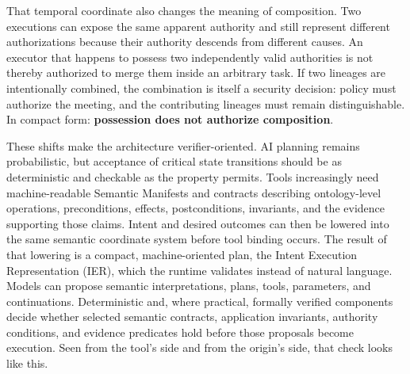 \documentclass[10pt,oneside,openany]{book}
\begin{document}
That temporal coordinate also changes the meaning of composition. Two executions can expose the same apparent authority and still represent different authorizations because their authority descends from different causes. An executor that happens to possess two independently valid authorities is not thereby authorized to merge them inside an arbitrary task. If two lineages are intentionally combined, the combination is itself a security decision: policy must authorize the meeting, and the contributing lineages must remain distinguishable. In compact form: \textbf{possession does not authorize composition}.

These shifts make the architecture verifier-oriented. AI planning remains probabilistic, but acceptance of critical state transitions should be as deterministic and checkable as the property permits. Tools increasingly need machine-readable Semantic Manifests and contracts describing ontology-level operations, preconditions, effects, postconditions, invariants, and the evidence supporting those claims. Intent and desired outcomes can then be lowered into the same semantic coordinate system before tool binding occurs. The result of that lowering is a compact, machine-oriented plan, the Intent Execution Representation (IER), which the runtime validates instead of natural language. Models can propose semantic interpretations, plans, tools, parameters, and continuations. Deterministic and, where practical, formally verified components decide whether selected semantic contracts, application invariants, authority conditions, and evidence predicates hold before those proposals become execution. Seen from the tool's side and from the origin's side, that check looks like this.
\end{document}

